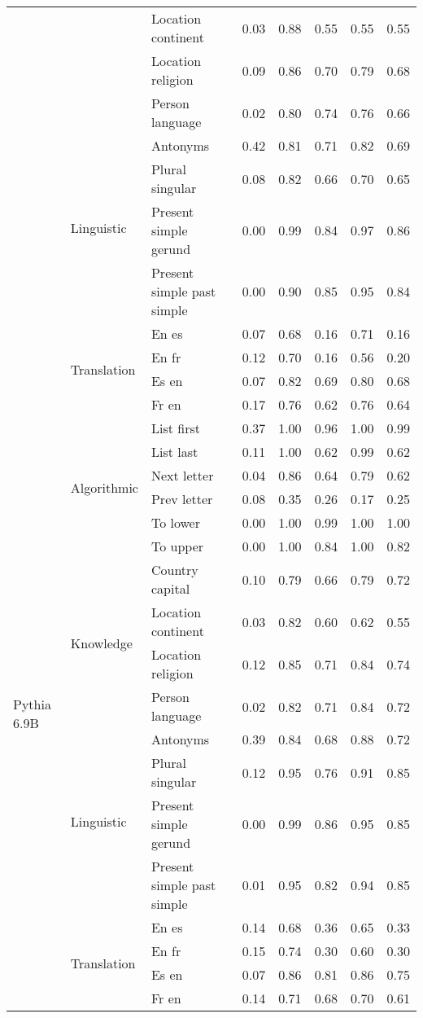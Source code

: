 \begin{center}
\begin{longtable}{lllrrrrr}
 &  & Location continent & 0.03 & 0.88 & 0.55 & 0.55 & 0.55 \\
 &  & Location religion & 0.09 & 0.86 & 0.70 & 0.79 & 0.68 \\
 &  & Person language & 0.02 & 0.80 & 0.74 & 0.76 & 0.66 \\
\cline{2-8}
 & \multirow[t]{4}{*}{Linguistic} & Antonyms & 0.42 & 0.81 & 0.71 & 0.82 & 0.69 \\
 &  & Plural singular & 0.08 & 0.82 & 0.66 & 0.70 & 0.65 \\
 &  & Present simple gerund & 0.00 & 0.99 & 0.84 & 0.97 & 0.86 \\
 &  & Present simple past simple & 0.00 & 0.90 & 0.85 & 0.95 & 0.84 \\
\cline{2-8}
 & \multirow[t]{4}{*}{Translation} & En es & 0.07 & 0.68 & 0.16 & 0.71 & 0.16 \\
 &  & En fr & 0.12 & 0.70 & 0.16 & 0.56 & 0.20 \\
 &  & Es en & 0.07 & 0.82 & 0.69 & 0.80 & 0.68 \\
 &  & Fr en & 0.17 & 0.76 & 0.62 & 0.76 & 0.64 \\
\cline{1-8} \cline{2-8}
\multirow[t]{18}{*}{Pythia 6.9B} & \multirow[t]{6}{*}{Algorithmic} & List first & 0.37 & 1.00 & 0.96 & 1.00 & 0.99 \\
 &  & List last & 0.11 & 1.00 & 0.62 & 0.99 & 0.62 \\
 &  & Next letter & 0.04 & 0.86 & 0.64 & 0.79 & 0.62 \\
 &  & Prev letter & 0.08 & 0.35 & 0.26 & 0.17 & 0.25 \\
 &  & To lower & 0.00 & 1.00 & 0.99 & 1.00 & 1.00 \\
 &  & To upper & 0.00 & 1.00 & 0.84 & 1.00 & 0.82 \\
\cline{2-8}
 & \multirow[t]{4}{*}{Knowledge} & Country capital & 0.10 & 0.79 & 0.66 & 0.79 & 0.72 \\
 &  & Location continent & 0.03 & 0.82 & 0.60 & 0.62 & 0.55 \\
 &  & Location religion & 0.12 & 0.85 & 0.71 & 0.84 & 0.74 \\
 &  & Person language & 0.02 & 0.82 & 0.71 & 0.84 & 0.72 \\
\cline{2-8}
 & \multirow[t]{4}{*}{Linguistic} & Antonyms & 0.39 & 0.84 & 0.68 & 0.88 & 0.72 \\
 &  & Plural singular & 0.12 & 0.95 & 0.76 & 0.91 & 0.85 \\
 &  & Present simple gerund & 0.00 & 0.99 & 0.86 & 0.95 & 0.85 \\
 &  & Present simple past simple & 0.01 & 0.95 & 0.82 & 0.94 & 0.85 \\
\cline{2-8}
 & \multirow[t]{4}{*}{Translation} & En es & 0.14 & 0.68 & 0.36 & 0.65 & 0.33 \\
 &  & En fr & 0.15 & 0.74 & 0.30 & 0.60 & 0.30 \\
 &  & Es en & 0.07 & 0.86 & 0.81 & 0.86 & 0.75 \\
 &  & Fr en & 0.14 & 0.71 & 0.68 & 0.70 & 0.61 \\
\cline{1-8} \cline{2-8}
\bottomrule
\end{longtable}

\end{center}
\twocolumn